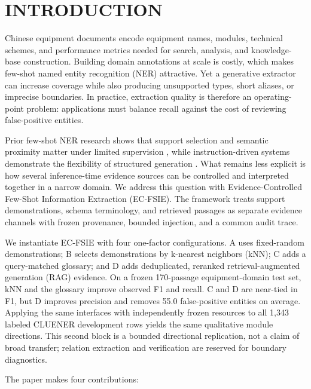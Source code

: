 \section{INTRODUCTION}

Chinese equipment documents encode equipment names, modules, technical
schemes, and performance metrics needed for search, analysis, and knowledge-base
construction. Building domain annotations at scale is costly, which makes
few-shot named entity recognition (NER) attractive. Yet a generative extractor
can increase coverage while also producing unsupported types, short aliases,
or imprecise boundaries. In practice, extraction quality is therefore an
operating-point problem: applications must balance recall against the cost of
reviewing false-positive entities.

Prior few-shot NER research shows that support selection and semantic proximity
matter under limited supervision
\cite{ding2021fewnerd,yang2020structured,ma2022decomposed}, while
instruction-driven systems demonstrate the flexibility of structured generation
\cite{lu2022uie,wang2023instructuie,wang2023gptner,luo2025oneke}. What remains
less explicit is how several inference-time evidence sources can be controlled
and interpreted together in a narrow domain. We address this question with
Evidence-Controlled Few-Shot Information Extraction (EC-FSIE). The framework
treats support demonstrations, schema terminology, and retrieved passages as
separate evidence channels with frozen provenance, bounded injection, and a
common audit trace.

We instantiate EC-FSIE with four one-factor configurations. A uses fixed-random
demonstrations; B selects demonstrations by k-nearest neighbors (kNN); C adds a
query-matched glossary; and D adds deduplicated, reranked retrieval-augmented
generation (RAG) evidence. On a frozen 170-passage equipment-domain test set,
kNN and the glossary improve observed F1 and recall. C and D are near-tied in
F1, but D improves precision and removes 55.0 false-positive entities on
average. Applying the same interfaces with independently frozen resources to
all 1,343 labeled CLUENER development rows yields the same qualitative module
directions. This second block is a bounded directional replication, not a
claim of broad transfer; relation extraction and verification are reserved for
boundary diagnostics.

The paper makes four contributions:

